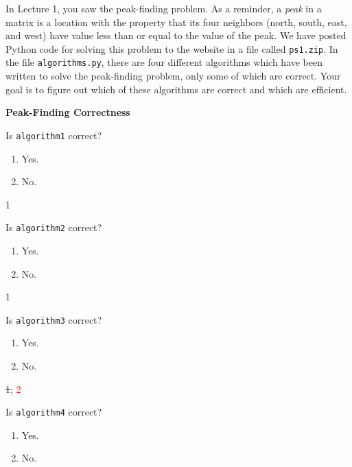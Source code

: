 \documentclass[12pt,twoside]{article}
\begin{document}
\begin{problems}
    In Lecture 1, you saw the peak-finding problem. As a reminder, a \emph{peak} in
    a matrix is a location with the property that its four neighbors (north, south,
    east, and west) have value less than or equal to the value of the peak. We have
    posted Python code for solving this problem to the website in a file called
    \texttt{ps1.zip}. In the file \texttt{algorithms.py}, there are four different
    algorithms which have been written to solve the peak-finding problem, only some
    of which are correct. Your goal is to figure out which of these algorithms are
    correct and which are efficient.

    \problem {} \textbf{Peak-Finding Correctness}

    \begin{problemparts}

        \problempart {} Is \texttt{algorithm1} correct?
        \begin{enumerate}
            \item Yes.
            \item No.
        \end{enumerate}

        \ifsolution \solution{}
            1
        \fi

        \problempart {} Is \texttt{algorithm2} correct?
        \begin{enumerate}
            \item Yes.
            \item No.
        \end{enumerate}

        \ifsolution \solution{}
            1
        \fi

        \problempart {} Is \texttt{algorithm3} correct?
        \begin{enumerate}
            \item Yes.
            \item No.
        \end{enumerate}

        \ifsolution \solution{}
            \sout{1}; \textcolor{red}{2}
        \fi

        \problempart {} Is \texttt{algorithm4} correct?
        \begin{enumerate}
            \item Yes.
            \item No.
        \end{enumerate}


\end{problemparts}
\end{problems}
\end{document}
